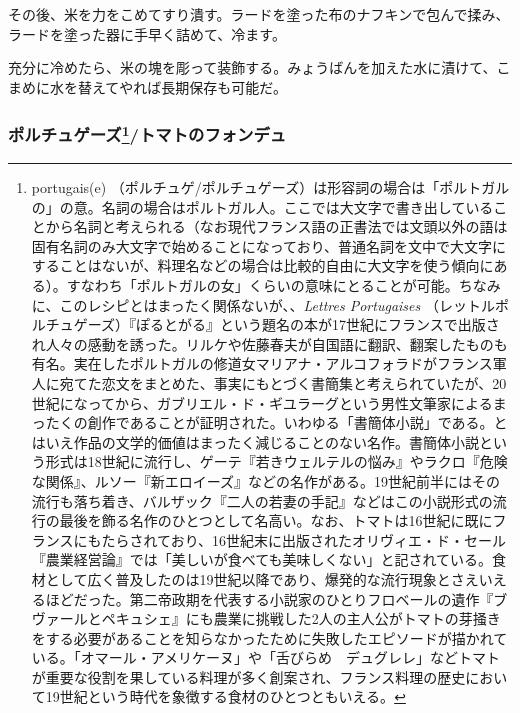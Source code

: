 \begin{recette}
その後、米を力をこめてすり潰す。ラードを塗った布のナフキンで包んで揉み、ラードを塗った器に手早く詰めて、冷ます。

充分に冷めたら、米の塊を彫って装飾する。みょうばんを加えた水に漬けて、こまめに水を替えてやれば長期保存も可能だ。

\atoaki{}

\hypertarget{portugaise}{%
\subsubsection[ポルチュゲーズ/トマトのフォンデュ]{\texorpdfstring{ポルチュゲーズ\footnote{portugais(e)
  （ポルチュゲ/ポルチュゲーズ）は形容詞の場合は「ポルトガルの」の意。名詞の場合はポルトガル人。ここでは大文字で書き出していることから名詞と考えられる（なお現代フランス語の正書法では文頭以外の語は固有名詞のみ大文字で始めることになっており、普通名詞を文中で大文字にすることはないが、料理名などの場合は比較的自由に大文字を使う傾向にある）。すなわち「ポルトガルの女」くらいの意味にとることが可能。ちなみに、このレシピとはまったく関係ないが、、\emph{Lettres
  Portugaises}
  （レットルポルチュゲーズ）『ぽるとがる』という題名の本が17世紀にフランスで出版され人々の感動を誘った。リルケや佐藤春夫が自国語に翻訳、翻案したものも有名。実在したポルトガルの修道女マリアナ・アルコフォラドがフランス軍人に宛てた恋文をまとめた、事実にもとづく書簡集と考えられていたが、20世紀になってから、ガブリエル・ド・ギユラーグという男性文筆家によるまったくの創作であることが証明された。いわゆる「書簡体小説」である。とはいえ作品の文学的価値はまったく減じることのない名作。書簡体小説という形式は18世紀に流行し、ゲーテ『若きウェルテルの悩み』やラクロ『危険な関係』、ルソー『新エロイーズ』などの名作がある。19世紀前半にはその流行も落ち着き、バルザック『二人の若妻の手記』などはこの小説形式の流行の最後を飾る名作のひとつとして名高い。なお、トマトは16世紀に既にフランスにもたらされており、16世紀末に出版されたオリヴィエ・ド・セール『農業経営論』では「美しいが食べても美味しくない」と記されている。食材として広く普及したのは19世紀以降であり、爆発的な流行現象とさえいえるほどだった。第二帝政期を代表する小説家のひとりフロベールの遺作『ブヴァールとペキュシェ』にも農業に挑戦した2人の主人公がトマトの芽掻きをする必要があることを知らなかったために失敗したエピソードが描かれている。「オマール・アメリケーヌ」や「舌びらめ　デュグレレ」などトマトが重要な役割を果している料理が多く創案され、フランス料理の歴史において19世紀という時代を象徴する食材のひとつともいえる。}/トマトのフォンデュ}{ポルチュゲーズ/トマトのフォンデュ}}\label{portugaise}}


\end{recette}

